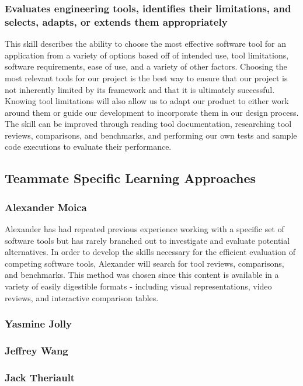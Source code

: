 \documentclass[12pt]{article}
\begin{document}
\subsubsection{Evaluates engineering tools, identifies their limitations, and selects, adapts, or extends them appropriately}
This skill describes the ability to choose the most effective software tool for an application from a variety of options based off of intended use, tool limitations, software requirements, ease of use, and a variety of other factors. Choosing the most relevant tools for our project is the best way to ensure that our project is not inherently limited by its framework and that it is ultimately successful. Knowing tool limitations will also allow us to adapt our product to either work around them or guide our development to incorporate them in our design process. The skill can be improved through reading tool documentation, researching tool reviews, comparisons, and benchmarks, and performing our own tests and sample code executions to evaluate their performance. 

\subsection{Teammate Specific Learning Approaches}
\subsubsection{Alexander Moica}
Alexander has had repeated previous experience working with a specific set of software tools but has rarely branched out to investigate and evaluate potential alternatives. In order to develop the skills necessary for the efficient evaluation of competing software tools, Alexander will search for tool reviews, comparisons, and benchmarks. This method was chosen since this content is available in a variety of easily digestible formats - including visual representations, video reviews, and interactive comparison tables.

\subsubsection{Yasmine Jolly}
\subsubsection{Jeffrey Wang}
\subsubsection{Jack Theriault}
\end{document}
